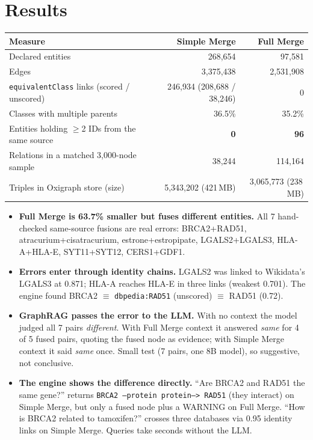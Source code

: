 \documentclass[10pt,a4paper]{article}
\newcommand{\code}[1]{\texttt{\small #1}}
\begin{document}
\section{Results}
\begin{center}
\small
\begin{tabular}{@{}lrr@{}}
\toprule
Measure & Simple Merge & Full Merge \\
\midrule
Declared entities & 268,654 & 97,581 \\
Edges & 3,375,438 & 2,531,908 \\
\code{equivalentClass} links (scored / unscored) & 246,934 (208,688 / 38,246) & 0 \\
Classes with multiple parents & 36.5\% & 35.2\% \\
Entities holding $\ge$2 IDs from the same source & \textbf{0} & \textbf{96} \\
Relations in a matched 3,000-node sample & 38,244 & 114,164 \\
Triples in Oxigraph store (size) & 5,343,202 (421\,MB) & 3,065,773 (238\,MB) \\
\bottomrule
\end{tabular}
\end{center}
\begin{itemize}
\item \textbf{Full Merge is 63.7\% smaller but fuses different entities.} All 7 hand-checked same-source fusions are real errors: BRCA2+RAD51, atracurium+cisatracurium, estrone+estropipate, LGALS2+LGALS3, HLA-A+HLA-E, SYT11+SYT12, CERS1+GDF1.
\item \textbf{Errors enter through identity chains.} LGALS2 was linked to Wikidata's LGALS3 at 0.871; HLA-A reaches HLA-E in three links (weakest 0.701). The engine found BRCA2 $\equiv$ \code{dbpedia:RAD51} (unscored) $\equiv$ RAD51 (0.72).
\item \textbf{GraphRAG passes the error to the LLM.} With no context the model judged all 7 pairs \emph{different}. With Full Merge context it answered \emph{same} for 4 of 5 fused pairs, quoting the fused node as evidence; with Simple Merge context it said \emph{same} once. Small test (7 pairs, one 8B model), so suggestive, not conclusive.
\item \textbf{The engine shows the difference directly.} ``Are BRCA2 and RAD51 the same gene?'' returns \code{BRCA2 --protein protein--> RAD51} (they interact) on Simple Merge, but only a fused node plus a WARNING on Full Merge. ``How is BRCA2 related to tamoxifen?'' crosses three databases via 0.95 identity links on Simple Merge. Queries take seconds without the LLM.
\end{itemize}
\end{document}
